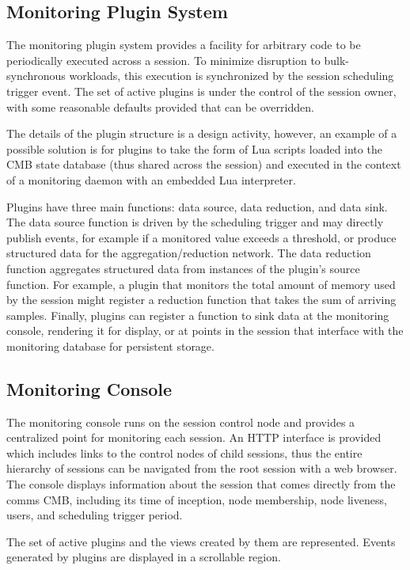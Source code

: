 \subsection{Monitoring Plugin System}

The monitoring plugin system provides a facility for arbitrary code to be
periodically executed across a session.  To minimize disruption to
bulk-synchronous workloads, this execution is synchronized by the 
session scheduling trigger event.  The set of active plugins is
under the control of the session owner, with some reasonable
defaults provided that can be overridden.

The details of the plugin structure is a design activity, however,
an example of a possible solution is for plugins to take the form of
Lua scripts loaded into the CMB state database
(thus shared across the session) and executed in the context of
a monitoring daemon with an embedded Lua interpreter.

Plugins have three main functions: data source, data reduction,
and data sink.  The data source function is driven by the scheduling
trigger and may directly publish events, for example if a monitored
value exceeds a threshold, or produce structured data for the
aggregation/reduction network.
The data reduction function aggregates structured data from instances
of the plugin's source function.
For example, a plugin that monitors the total amount of memory used
by the session might register a reduction function that takes the sum of
arriving samples.
Finally, plugins can register a function to sink data at the monitoring
console, rendering it for display, or at points in the session that interface
with the monitoring database for persistent storage.

\subsection{Monitoring Console}

The monitoring console runs on the session control node and provides
a centralized point for monitoring each session.
An HTTP interface is provided which includes links to the control nodes
of child sessions, thus the entire hierarchy of sessions can be navigated
from the root session with a web browser.
The console displays information about the session that comes directly
from the comms CMB, including its time of inception, node membership,
node liveness, users, and scheduling trigger period.

The set of active plugins and the views created by them are represented.
Events generated by plugins are displayed in a scrollable region.

